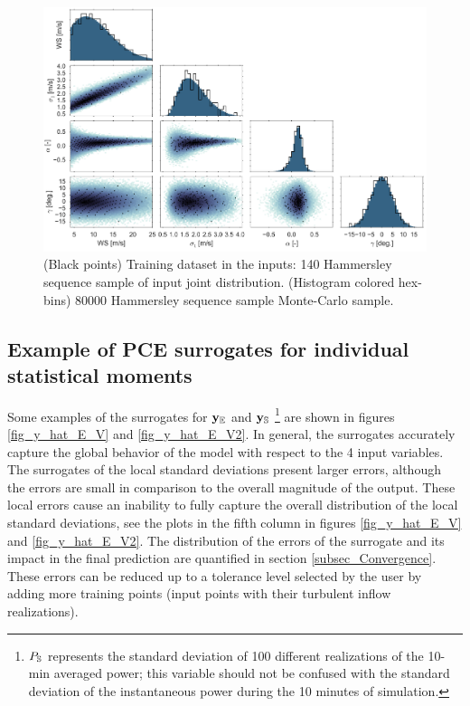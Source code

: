 \documentclass[preprint,12pt]{elsarticle}
\begin{document}
\begin{figure}[h!]
\begin{centering}
\includegraphics[width=0.96\columnwidth]{Figures/PCE_train_x_full.jpg}
\caption{(Black points) Training dataset in the inputs: 140 Hammersley sequence sample of input joint distribution. (Histogram colored hex-bins) 80000 Hammersley sequence sample Monte-Carlo sample.}
\label{fig_PCE_train_x_full}
\end{centering}
\end{figure}

\subsection{Example of PCE surrogates for individual statistical moments}

Some examples of the surrogates for $\mathbf{y}_{\mathbb{E}}$ and $\mathbf{y}_{\mathbb{S}}$ \footnote{$P_{\mathbb{S}}$ represents the standard deviation of 100 different realizations of the 10-min averaged power; this variable should not be confused with the standard deviation of the instantaneous power during the 10 minutes of simulation.} are shown in figures \ref{fig_y_hat_E_V} and \ref{fig_y_hat_E_V2}. In general, the surrogates accurately capture the global behavior of the model with respect to the 4 input variables. The surrogates of the local standard deviations present larger errors, although the errors are small in comparison to the overall magnitude of the output. These local errors cause an inability to fully capture the overall distribution of the local standard deviations, see the plots in the fifth column in figures \ref{fig_y_hat_E_V} and \ref{fig_y_hat_E_V2}. The distribution of the errors of the surrogate and its impact in the final prediction are quantified in section \ref{subsec_Convergence}. These errors can be reduced up to a tolerance level selected by the user by adding more training points (input points with their turbulent inflow realizations).
\end{document}
